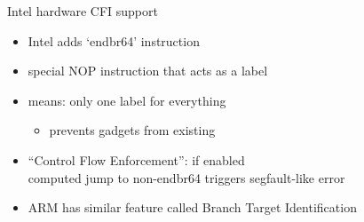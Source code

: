 \begin{frame}{Intel hardware CFI support}
    \begin{itemize}
    \item Intel adds `endbr64' instruction
    \item special NOP instruction that acts as a label
    \item means: only one label for everything
        \begin{itemize}
        \item prevents gadgets from existing
        \end{itemize}
    \vspace{.5cm}
    \item ``Control Flow Enforcement'': if enabled \\
        computed jump to non-endbr64 triggers segfault-like error
    \vspace{.5cm}
    \item ARM has similar feature called Branch Target Identification
    \end{itemize}
\end{frame}
